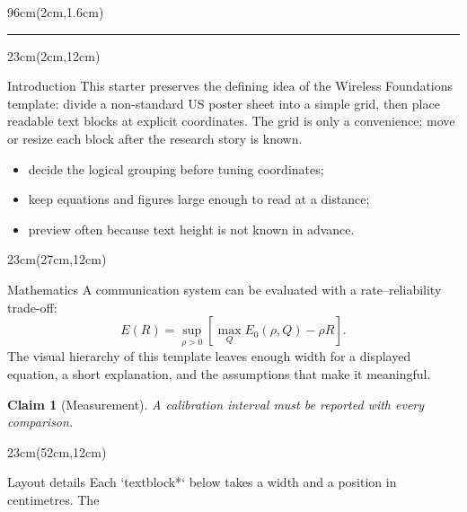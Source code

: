 \documentclass[final]{beamer}
\newtheorem{claim}{Claim}
\begin{document}
\begin{frame}[t]
\begin{textblock*}{96cm}(2cm,1.6cm)
  \centering{}\par
  \vspace{0.25cm}{\Large Anand D. Sarwate-style conference poster starter · replace with your authors and affiliation}\par
  \vspace{0.45cm}\color{signalblue}\rule{92cm}{0.18cm}
\end{textblock*}
\begin{textblock*}{23cm}(2cm,12cm)\begin{block}{Introduction}
  This starter preserves the defining idea of the Wireless Foundations
  template: divide a non-standard US poster sheet into a simple grid, then
  place readable text blocks at explicit coordinates. The grid is only a
  convenience; move or resize each block after the research story is known.
  \begin{itemize}\itemsep0.25em
    \item decide the logical grouping before tuning coordinates;
    \item keep equations and figures large enough to read at a distance;
    \item preview often because text height is not known in advance.
  \end{itemize}
\end{block}\end{textblock*}
\begin{textblock*}{23cm}(27cm,12cm)\begin{block}{Mathematics}
  A communication system can be evaluated with a rate--reliability trade-off:
  \[
    E(R)=\sup_{\rho>0}\left[\max_Q E_0(\rho,Q)-\rho R\right].
  \]
  The visual hierarchy of this template leaves enough width for a displayed
  equation, a short explanation, and the assumptions that make it meaningful.
  \begin{claim}[Measurement]
    A calibration interval must be reported with every comparison.
  \end{claim}
\end{block}\end{textblock*}
\begin{textblock*}{23cm}(52cm,12cm)\begin{block}{Layout details}
  Each `textblock*` below takes a width and a position in centimetres. The

\end{block}
\end{textblock*}
\end{frame}
\end{document}
